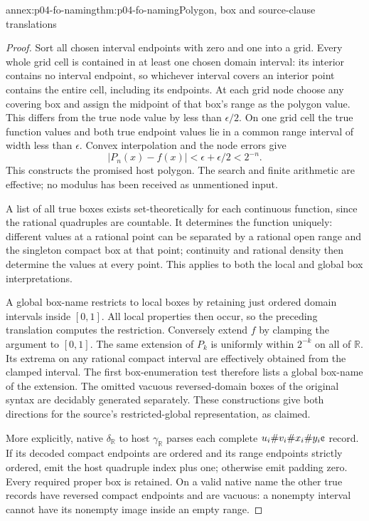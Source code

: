 \begin{annexitem}{annex:p04-fo-naming}{thm:p04-fo-naming}{Polygon, box and source-clause translations}
\begin{proof}
Sort all chosen interval endpoints with zero and one into
a grid. Every whole grid cell is contained in at least one
chosen domain interval: its interior contains no interval
endpoint, so whichever interval covers an interior point
contains the entire cell, including its endpoints.
At each grid node choose any covering box and assign the
midpoint of that box's range as the polygon value.
This differs from the true node value by less than
\(\epsilon/2\). On one grid cell the true function values
and both true endpoint values lie in a common range interval
of width less than \(\epsilon\).
Convex interpolation and the node errors give
\[
 |P_n(x)-f(x)|<\epsilon+\epsilon/2<2^{-n}.
\]
This constructs the promised host polygon. The search and
finite arithmetic are effective; no modulus has been received
as unmentioned input.

A list of all true boxes exists set-theoretically for each
continuous function, since the rational quadruples are countable.
It determines the function uniquely: different values at a
rational point can be separated by a rational open range and
the singleton compact box at that point; continuity and rational
density then determine the values at every point. This applies
to both the local and global box interpretations.

A global box-name restricts to local boxes by retaining just
ordered domain intervals inside \([0,1]\). All local properties
then occur, so the preceding translation computes the restriction.
Conversely extend \(f\) by clamping the argument to \([0,1]\).
The same extension of \(P_k\) is uniformly within \(2^{-k}\)
on all of \(\mathbb R\). Its extrema on any rational compact
interval are effectively obtained from the clamped interval.
The first box-enumeration test therefore lists a global
box-name of the extension. The omitted vacuous reversed-domain
boxes of the original syntax are decidably generated separately.
These constructions give both directions for the source's
restricted-global representation, as claimed.

More explicitly, native \(\delta_{\mathbb R}\) to host
\(\gamma_{\mathbb R}\) parses each complete
\(u_i\#v_i\#x_i\#y_i\text{\textcent}\) record.
If its decoded compact endpoints are ordered and its range
endpoints strictly ordered, emit the host quadruple index
plus one; otherwise emit padding zero. Every required proper
box is retained. On a valid native name the other true
records have reversed compact endpoints and are vacuous:
a nonempty interval cannot have its nonempty image inside
an empty range.


\end{proof}
\end{annexitem}
